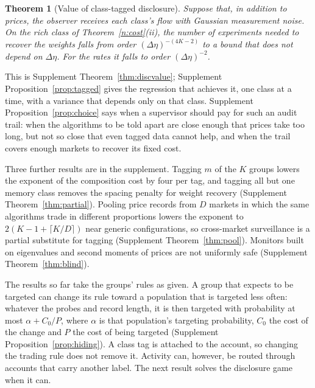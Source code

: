 \documentclass[12pt]{article}
\newtheorem{theorem}{Theorem}[section]
\theoremstyle{definition}
\theoremstyle{remark}
\begin{document}
\begin{theorem}[Value of class-tagged disclosure]\label{n:disc}
Suppose that, in addition to prices, the observer receives each class's flow with Gaussian measurement noise. On the rich class of Theorem~\ref{n:cost}(ii), the number of experiments needed to recover the weights falls from order $(\Delta\eta)^{-(4K-2)}$ to a bound that does not depend on $\Delta\eta$. For the rates it falls to order $(\Delta\eta)^{-2}$.
\end{theorem}

This is Supplement Theorem~\ref{thm:discvalue}; Supplement Proposition~\ref{prop:tagged} gives the regression that achieves it, one class at a time, with a variance that depends only on that class. Supplement Proposition~\ref{prop:choice} says when a supervisor should pay for such an audit trail: when the algorithms to be told apart are close enough that prices take too long, but not so close that even tagged data cannot help, and when the trail covers enough markets to recover its fixed cost.

Three further results are in the supplement. Tagging $m$ of the $K$ groups lowers the exponent of the composition cost by four per tag, and tagging all but one memory class removes the spacing penalty for weight recovery (Supplement Theorem~\ref{thm:partial}). Pooling price records from $D$ markets in which the same algorithms trade in different proportions lowers the exponent to $2(K-1+\lceil K/D\rceil)$ near generic configurations, so cross-market surveillance is a partial substitute for tagging (Supplement Theorem~\ref{thm:pool}). Monitors built on eigenvalues and second moments of prices are not uniformly safe (Supplement Theorem~\ref{thm:blind}).

The results so far take the groups' rules as given. A group that expects to be targeted can change its rule toward a population that is targeted less often: whatever the probes and record length, it is then targeted with probability at most $\alpha+C_0/P$, where $\alpha$ is that population's targeting probability, $C_0$ the cost of the change and $P$ the cost of being targeted (Supplement Proposition~\ref{prop:hiding}). A class tag is attached to the account, so changing the trading rule does not remove it. Activity can, however, be routed through accounts that carry another label. The next result solves the disclosure game when it can.
\end{document}
